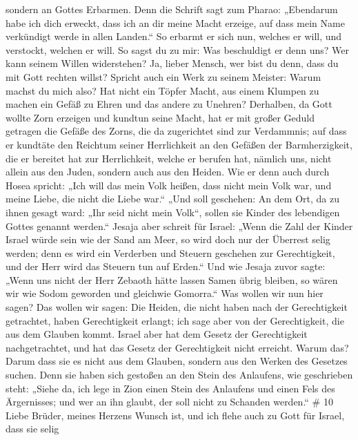 sondern an Gottes Erbarmen.  Denn die Schrift sagt zum
Pharao: „Ebendarum habe ich dich erweckt, dass ich an dir meine Macht
erzeige, auf dass mein Name verkündigt werde in allen Landen.``
 So erbarmt er sich nun, welches er will, und verstockt,
welchen er will.  So sagst du zu mir: Was beschuldigt er
denn uns? Wer kann seinem Willen widerstehen?  Ja, lieber
Mensch, wer bist du denn, dass du mit Gott rechten willst? Spricht auch
ein Werk zu seinem Meister: Warum machst du mich also?  Hat
nicht ein Töpfer Macht, aus einem Klumpen zu machen ein Gefäß zu Ehren
und das andere zu Unehren?  Derhalben, da Gott wollte Zorn
erzeigen und kundtun seine Macht, hat er mit großer Geduld getragen die
Gefäße des Zorns, die da zugerichtet sind zur Verdammnis; 
auf dass er kundtäte den Reichtum seiner Herrlichkeit an den Gefäßen der
Barmherzigkeit, die er bereitet hat zur Herrlichkeit, 
welche er berufen hat, nämlich uns, nicht allein aus den Juden, sondern
auch aus den Heiden.  Wie er denn auch durch Hosea spricht:
„Ich will das mein Volk heißen, dass nicht mein Volk war, und meine
Liebe, die nicht die Liebe war.``  „Und soll geschehen: An
dem Ort, da zu ihnen gesagt ward: „Ihr seid nicht mein Volk``, sollen
sie Kinder des lebendigen Gottes genannt werden.``  Jesaja
aber schreit für Israel: „Wenn die Zahl der Kinder Israel würde sein wie
der Sand am Meer, so wird doch nur der Überrest selig werden;
 denn es wird ein Verderben und Steuern geschehen zur
Gerechtigkeit, und der Herr wird das Steuern tun auf Erden.``
 Und wie Jesaja zuvor sagte: „Wenn uns nicht der Herr
Zebaoth hätte lassen Samen übrig bleiben, so wären wir wie Sodom
geworden und gleichwie Gomorra.``  Was wollen wir nun hier
sagen? Das wollen wir sagen: Die Heiden, die nicht haben nach der
Gerechtigkeit getrachtet, haben Gerechtigkeit erlangt; ich sage aber von
der Gerechtigkeit, die aus dem Glauben kommt.  Israel aber
hat dem Gesetz der Gerechtigkeit nachgetrachtet, und hat das Gesetz der
Gerechtigkeit nicht erreicht.  Warum das? Darum dass sie es
nicht aus dem Glauben, sondern aus den Werken des Gesetzes suchen. Denn
sie haben sich gestoßen an den Stein des Anlaufens,  wie
geschrieben steht: „Siehe da, ich lege in Zion einen Stein des Anlaufens
und einen Fels des Ärgernisses; und wer an ihn glaubt, der soll nicht zu
Schanden werden.`` \# 10  Liebe Brüder, meines Herzens
Wunsch ist, und ich flehe auch zu Gott für Israel, dass sie selig
